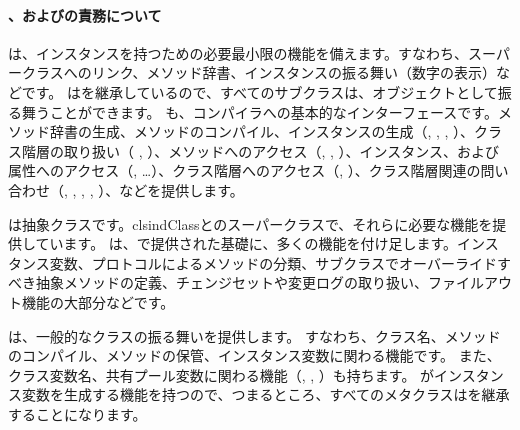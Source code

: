 \documentclass[a4paper,10pt,twoside]{book}
\begin{document}

\paragraph{、およびの責務について}
は、インスタンスを持つための必要最小限の機能を備えます。すなわち、スーパークラスへのリンク、メソッド辞書、インスタンスの振る舞い（\ie 数字の表示）などです。
はを継承しているので、すべてのサブクラスは、オブジェクトとして振る舞うことができます。
も、コンパイラへの基本的なインターフェースです。メソッド辞書の生成、メソッドのコンパイル、インスタンスの生成（\ie {}, , , ）、クラス階層の取り扱い（\ie {} , ）、メソッドへのアクセス（\ie {}, , ）、インスタンス、および属性へのアクセス（\ie {}, \ldots）、クラス階層へのアクセス（\ie {}, ）、クラス階層関連の問い合わせ（\ie {}, , , , ）、などを提供します。

は抽象クラスです。clsind{Class}とのスーパークラスで、それらに必要な機能を提供しています。
は、で提供された基礎に、多くの機能を付け足します。インスタンス変数、プロトコルによるメソッドの分類、サブクラスでオーバーライドすべき抽象メソッドの定義、チェンジセットや変更ログの取り扱い、ファイルアウト機能の大部分などです。

は、一般的なクラスの振る舞いを提供します。
すなわち、クラス名、メソッドのコンパイル、メソッドの保管、インスタンス変数に関わる機能です。
また、クラス変数名、共有プール変数に関わる機能（, , ）も持ちます。
がインスタンス変数を生成する機能を持つので、つまるところ、すべてのメタクラスはを継承することになります。

\end{document}
